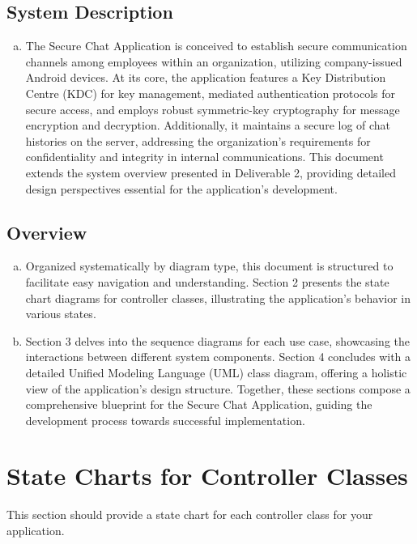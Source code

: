 \documentclass[]{article}
\begin{document}
\subsection{System Description}
\label{sub:system_description}
\begin{enumerate}[a)]
    \item The Secure Chat Application is conceived to establish secure communication channels among employees within an organization, utilizing company-issued Android devices. At its core, the application features a Key Distribution Centre (KDC) for key management, mediated authentication protocols for secure access, and employs robust symmetric-key cryptography for message encryption and decryption. Additionally, it maintains a secure log of chat histories on the server, addressing the organization's requirements for confidentiality and integrity in internal communications. This document extends the system overview presented in Deliverable 2, providing detailed design perspectives essential for the application's development.
\end{enumerate}

\subsection{Overview}
\label{sub:overview}
\begin{enumerate}[a)]
    \item Organized systematically by diagram type, this document is structured to facilitate easy navigation and understanding. Section 2 presents the state chart diagrams for controller classes, illustrating the application's behavior in various states.
    \item Section 3 delves into the sequence diagrams for each use case, showcasing the interactions between different system components. Section 4 concludes with a detailed Unified Modeling Language (UML) class diagram, offering a holistic view of the application's design structure. Together, these sections compose a comprehensive blueprint for the Secure Chat Application, guiding the development process towards successful implementation.
\end{enumerate}



\section{State Charts for Controller Classes}
\label{sec:state_charts_for_controller_classes}
This section should provide a state chart for each controller class for your application.
\end{document}
